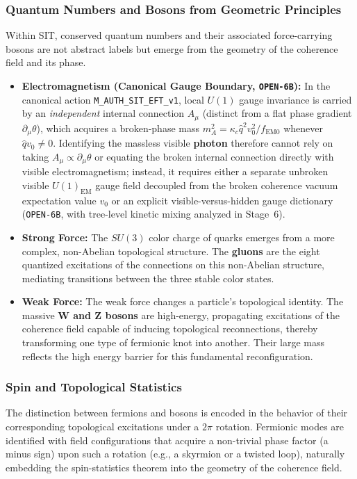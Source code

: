 \subsubsection{Quantum Numbers and Bosons from Geometric Principles}

Within SIT, conserved quantum numbers and their associated force-carrying bosons are not abstract labels but emerge from the geometry of the coherence field and its phase.

\begin{itemize}
    \item \textbf{Electromagnetism (Canonical Gauge Boundary, \texttt{OPEN-6B}):} In the canonical action \texttt{M\_AUTH\_SIT\_EFT\_v1}, local $U(1)$ gauge invariance is carried by an \emph{independent} internal connection $A_\mu$ (distinct from a flat phase gradient $\partial_\mu\theta$), which acquires a broken-phase mass $m_A^2 = \kappa_c \hat{q}^2 v_0^2 / f_{\mathrm{EM}0}$ whenever $\hat{q}v_0 \ne 0$. Identifying the massless visible \textbf{photon} therefore cannot rely on taking $A_\mu \propto \partial_\mu\theta$ or equating the broken internal connection directly with visible electromagnetism; instead, it requires either a separate unbroken visible $U(1)_{\mathrm{EM}}$ gauge field decoupled from the broken coherence vacuum expectation value $v_0$ or an explicit visible-versus-hidden gauge dictionary (\texttt{OPEN-6B}, with tree-level kinetic mixing analyzed in Stage~6).

    \item \textbf{Strong Force:} The $SU(3)$ color charge of quarks emerges from a more complex, non-Abelian topological structure. The \textbf{gluons} are the eight quantized excitations of the connections on this non-Abelian structure, mediating transitions between the three stable color states.

    \item \textbf{Weak Force:} The weak force changes a particle's topological identity. The massive \textbf{W and Z bosons} are high-energy, propagating excitations of the coherence field capable of inducing topological reconnections, thereby transforming one type of fermionic knot into another. Their large mass reflects the high energy barrier for this fundamental reconfiguration.
\end{itemize}

\subsubsection{Spin and Topological Statistics}
The distinction between fermions and bosons is encoded in the behavior of their corresponding topological excitations under a $2\pi$ rotation. Fermionic modes are identified with field configurations that acquire a non-trivial phase factor (a minus sign) upon such a rotation (e.g., a skyrmion or a twisted loop), naturally embedding the spin-statistics theorem into the geometry of the coherence field.

